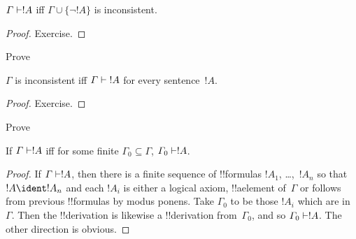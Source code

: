 \documentclass[../../include/open-logic-section]{subfiles}
\begin{document}
\begin{prop} 
$\Gamma \Proves !A$ iff $\Gamma \cup \{\lnot !A\}$ is inconsistent.
\end{prop}

\begin{proof}
Exercise.
\end{proof}

\begin{prob}
Prove 
\end{prob}

\begin{prop}
$\Gamma$ is inconsistent iff $\Gamma \Proves {!A}$ for every
  sentence~$!A$.
\end{prop}

\begin{proof}
Exercise.
\end{proof}

\begin{prob}
Prove 
\end{prob}

\begin{prop}
If $\Gamma \Proves !A$ iff for some finite $\Gamma_0 \subseteq
\Gamma$, $\Gamma_0 \Proves !A$.
\end{prop}

\begin{proof}
If $\Gamma \Proves !A$, then there is a finite sequence of
!!{formula}s $!A_1$, \dots,~$!A_n$ so that $!A \ident !A_n$ and each
$!A_i$ is either a logical axiom, !!a{element} of~$\Gamma$ or follows
from previous !!{formula}s by modus ponens.  Take $\Gamma_0$ to be
those $!A_i$ which are in~$\Gamma$.  Then the !!{derivation} is
likewise a !!{derivation} from~$\Gamma_0$, and so $\Gamma_0 \Proves
!A$.  The other direction is obvious.
\end{proof}
\end{document}
